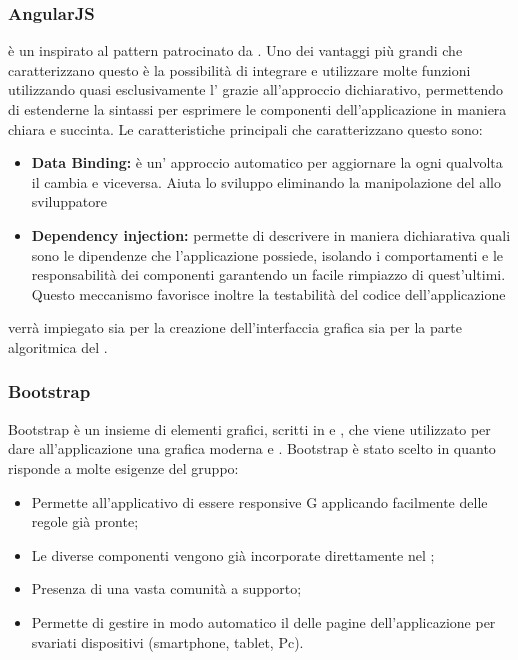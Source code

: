 \documentclass[12pt,a4paper]{article}
\begin{document}
\subsubsection{AngularJS}\label{angularjs}
 è un     inspirato al pattern  patrocinato da .
Uno dei vantaggi più grandi che caratterizzano questo  è la possibilità di integrare e
utilizzare molte funzioni utilizzando quasi esclusivamente l’ grazie all’approccio dichiarativo, permettendo di estenderne la sintassi per esprimere le componenti dell’applicazione in maniera chiara e succinta.
Le caratteristiche principali che caratterizzano questo  sono:
\begin{itemize}
	\item \textbf{Data Binding:} è un’ approccio automatico per aggiornare la  ogni qualvolta il  cambia e viceversa. Aiuta lo sviluppo eliminando la manipolazione del  allo sviluppatore
	\item \textbf{Dependency injection:} permette di descrivere in maniera dichiarativa quali sono le
	dipendenze che l’applicazione possiede, isolando i comportamenti e le responsabilità dei componenti garantendo un facile rimpiazzo di quest’ultimi. Questo meccanismo favorisce inoltre la testabilità del codice dell’applicazione	
\end{itemize}
 verrà impiegato sia per la creazione dell’interfaccia grafica sia per la parte algoritmica del .



\subsubsection{Bootstrap}\label{bootstrap}
Bootstrap è un insieme di elementi grafici, scritti in  e , che viene utilizzato per dare all'applicazione una grafica moderna e .
Bootstrap è stato scelto in quanto risponde a molte esigenze del gruppo:
\begin{itemize}
	\item Permette all’applicativo di essere responsive G applicando facilmente delle regole già pronte;
	\item Le diverse componenti vengono già incorporate direttamente nel  ;
	\item Presenza di una vasta comunità a supporto;
	\item Permette di gestire in modo automatico il  delle pagine dell'applicazione per svariati dispositivi (smartphone, tablet, Pc).
\end{itemize}
\end{document}

